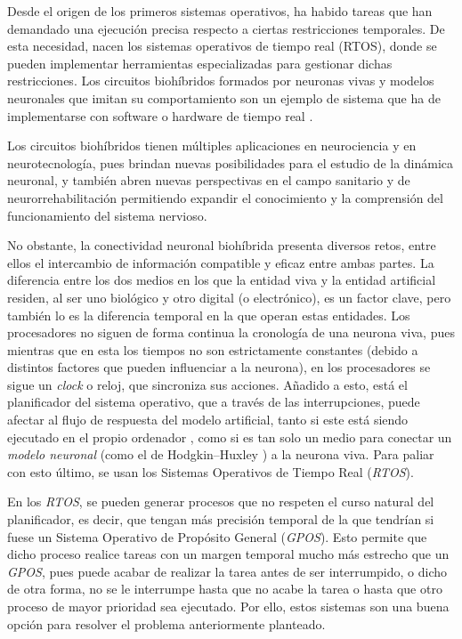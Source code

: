 
Desde el origen de los primeros sistemas operativos, ha habido tareas que han demandado una ejecución precisa respecto a ciertas restricciones temporales. De esta necesidad, nacen los sistemas operativos de tiempo real (RTOS), donde se pueden implementar herramientas especializadas para gestionar dichas restricciones. Los circuitos biohíbridos formados por neuronas vivas y modelos neuronales que imitan su comportamiento son un ejemplo de sistema que ha de implementarse con software o hardware de tiempo real \cite{Amaducci2019,Amaducci2022}.

Los circuitos biohíbridos tienen múltiples aplicaciones en neurociencia y en neurotecnología, pues brindan nuevas posibilidades para el estudio de la dinámica neuronal, y también abren nuevas perspectivas en el campo sanitario y de neurorrehabilitación permitiendo expandir el conocimiento y la comprensión del funcionamiento del sistema nervioso.

No obstante, la conectividad neuronal biohíbrida presenta diversos retos, entre ellos el intercambio de información compatible y eficaz entre ambas partes. La diferencia entre los dos medios en los que la entidad viva y la entidad artificial residen, al ser uno biológico y otro digital (o electrónico), es un factor clave, pero también lo es la diferencia temporal en la que operan estas entidades. Los procesadores no siguen de forma continua la cronología de una neurona viva, pues mientras que en esta los tiempos no son estrictamente constantes (debido a distintos factores que pueden influenciar a la neurona), en los procesadores se sigue un \textit{clock} o reloj, que sincroniza sus acciones. Añadido a esto, está el planificador del sistema operativo, que a través de las interrupciones, puede afectar al flujo de respuesta del modelo artificial, tanto si este está siendo ejecutado en el propio ordenador  \cite{Amaducci2019, Cerqueira2013}, como si es tan solo un medio para conectar un \textit{modelo neuronal} (como el de Hodgkin–Huxley \cite{Hodgkin1990}) a la neurona viva. Para paliar con esto último, se usan los Sistemas Operativos de Tiempo Real (\textit{RTOS}).

En los \textit{RTOS}, se pueden generar procesos que no respeten el curso natural del planificador, es decir, que tengan más precisión temporal de la que tendrían si fuese un Sistema Operativo de Propósito General (\textit{GPOS}). Esto permite que dicho proceso realice tareas con un margen temporal mucho más estrecho que un \textit{GPOS}, pues puede acabar de realizar la tarea antes de ser interrumpido, o dicho de otra forma, no se le interrumpe hasta que no acabe la tarea o hasta que otro proceso de mayor prioridad sea ejecutado. Por ello, estos sistemas son una buena opción para resolver el problema anteriormente planteado.

